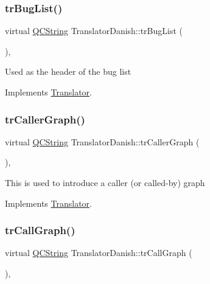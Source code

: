 \subsubsection{\texorpdfstring{trBugList()}{trBugList()}}
{\footnotesize\ttfamily virtual \mbox{\hyperlink{class_q_c_string}{Q\+C\+String}} Translator\+Danish\+::tr\+Bug\+List (\begin{DoxyParamCaption}{ }\end{DoxyParamCaption})\hspace{0.3cm}{\ttfamily [inline]}, {\ttfamily [virtual]}}

Used as the header of the bug list 

Implements \mbox{\hyperlink{class_translator}{Translator}}.

\mbox{\label{class_translator_danish_a8e70ce804e5afc7eac9391edd2668f1f}} 
\subsubsection{\texorpdfstring{trCallerGraph()}{trCallerGraph()}}
{\footnotesize\ttfamily virtual \mbox{\hyperlink{class_q_c_string}{Q\+C\+String}} Translator\+Danish\+::tr\+Caller\+Graph (\begin{DoxyParamCaption}{ }\end{DoxyParamCaption})\hspace{0.3cm}{\ttfamily [inline]}, {\ttfamily [virtual]}}

This is used to introduce a caller (or called-\/by) graph 

Implements \mbox{\hyperlink{class_translator}{Translator}}.

\mbox{\label{class_translator_danish_ae932ffa641d9bbf298b28a63c4dd9e58}} 
\subsubsection{\texorpdfstring{trCallGraph()}{trCallGraph()}}
{\footnotesize\ttfamily virtual \mbox{\hyperlink{class_q_c_string}{Q\+C\+String}} Translator\+Danish\+::tr\+Call\+Graph (\begin{DoxyParamCaption}{ }\end{DoxyParamCaption})\hspace{0.3cm}{\ttfamily [inline]}, {\ttfamily [virtual]}}

